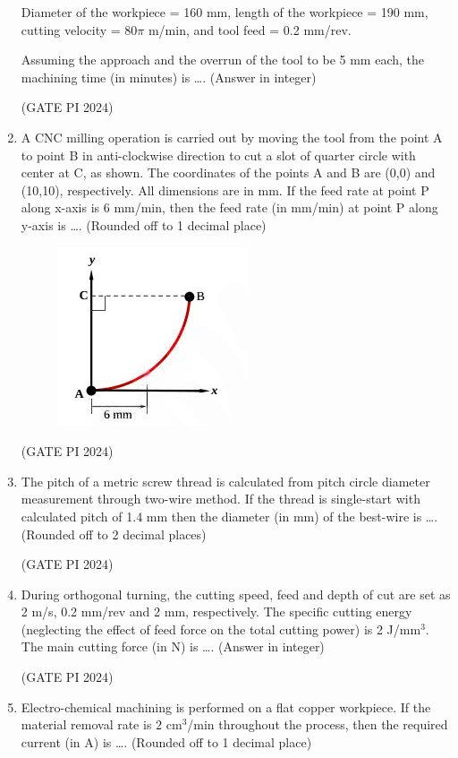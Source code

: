 \documentclass[journal,12pt,onecolumn]{IEEEtran}
\theoremstyle{remark}
\begin{document}
\begin{enumerate}
Diameter of the workpiece = 160 mm, length of the workpiece = 190 mm, cutting velocity = $80\pi$ m/min, and tool feed = 0.2 mm/rev.

Assuming the approach and the overrun of the tool to be 5 mm each, the machining time (in minutes) is \dots . (Answer in integer)

\hfill (GATE PI 2024)

\item A CNC milling operation is carried out by moving the tool from the point A to point B in anti-clockwise direction to cut a slot of quarter circle with center at C, as shown. The coordinates of the points A and B are (0,0) and (10,10), respectively. All dimensions are in mm. If the feed rate at point P along x-axis is 6 mm/min, then the feed rate (in mm/min) at point P along y-axis is \dots . (Rounded off to 1 decimal place)

\begin{figure}[H]
\centering
\includegraphics[width=0.5\columnwidth]{fig12.png}
\caption{}
\end{figure}
\hfill (GATE PI 2024)

\item The pitch of a metric screw thread is calculated from pitch circle diameter measurement through two-wire method. If the thread is single-start with calculated pitch of 1.4 mm then the diameter (in mm) of the best-wire is \dots . (Rounded off to 2 decimal places)

\hfill (GATE PI 2024)

\item During orthogonal turning, the cutting speed, feed and depth of cut are set as 2 m/s, 0.2 mm/rev and 2 mm, respectively. The specific cutting energy (neglecting the effect of feed force on the total cutting power) is 2 J/mm$^3$. The main cutting force (in N) is \dots . (Answer in integer)

\hfill (GATE PI 2024)
\item Electro-chemical machining is performed on a flat copper workpiece. If the material removal rate is $2$ cm$^3$/min throughout the process, then the required current (in A) is \dots . (Rounded off to 1 decimal place)


\end{enumerate}
\end{document}
